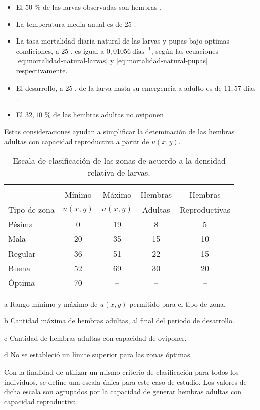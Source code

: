 \begin{itemize}
    \item El $50$ \% de las larvas observadas son hembras \cite{otero2006stochastic, manrique1998desarrollo}.
    \item La temperatura media anual es de 25 \textcelsius \cite{website:mspbsHistoria2014}.
    \item La tasa mortalidad diaria natural de las larvas y pupas bajo optimas condiciones, a 25 \textcelsius, es igual a $0,01056\ \text{días}^{-1}$, según las ecuaciones \eqref{eq:mortalidad-natural-larvas} y \eqref{eq:mortalidad-natural-pupas} respectivamente.
    \item El desarrollo, a 25 \textcelsius, de la larva hasta su emergencia a adulto es de $11,57$ días \cite{rueda1990temperature}.
    \item El $32,10$ \% de las hembras adultas no oviponen \cite{osoriopontificia}.
\end{itemize}

Estas consideraciones ayudan a simplificar la deteminación de las hembras adultas con capacidad
reproductiva a paritr de $u(x,y)$.

\begin{table}[!hptb]
\begin{threeparttable}
    \begin{minipage}[b]{0.5\textwidth}
    \caption{\label{tab:cap4-puntaje-zona} Escala de clasificación de las zonas de acuerdo a la densidad relativa de larvas.}
    \footnotesize
    \begin{tabular}{l c c c c}
        \hline \\
                     & Mínimo\tnote{a} & Máximo\tnote{a} & Hembras     & Hembras \\
        Tipo de zona & $u(x,y)$   & $u(x,y)$   & Adultas\tnote{b} & Reproductivas \tnote{c}\\
        \hline
        \hline
        Pésima  & 0  & 19 & 8  & 5 \\
        Mala    & 20 & 35 & 15 & 10\\
        Regular & 36 & 51 & 22 & 15\\
        Buena   & 52 & 69 & 30 & 20\\
        Óptima  & 70 & --\tnote{d} & --\tnote{d} & --\tnote{d}\\
        \hline
    \end{tabular}
    \begin{tablenotes}[flushleft]\footnotesize
    \item[a]{Rango mínimo y máximo de $u(x,y)$ permitido para el tipo de zona.}
    \item[b]{Cantidad máxima de hembras adultas, al final del periodo de desarrollo.}
    \item[c]{Cantidad de hembras adultas con capacidad de oviponer.}
    \item[d]{No se estableció un límite superior para las zonas óptimas. }
    \end{tablenotes}
    \end{minipage}
    \end{threeparttable}
\end{table}

Con la finalidad de utilizar un mismo criterio de clasificación para todos los individuos, se
define una escala única para este caso de estudio. Los valores de dicha escala son agrupados por
la capacidad de generar hembras adultas con capacidad reproductiva.
